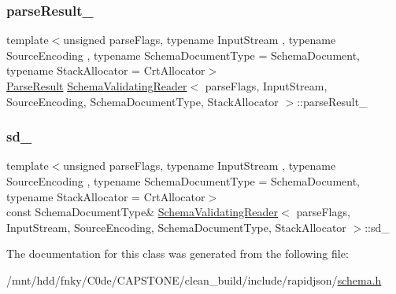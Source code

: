 \mbox{\label{classSchemaValidatingReader_a8d246c6285362e5a2eb578a6f7cebf25}} 
\subsubsection{\texorpdfstring{parse\+Result\+\_\+}{parseResult\_}}
{\footnotesize\ttfamily template$<$unsigned parse\+Flags, typename Input\+Stream , typename Source\+Encoding , typename Schema\+Document\+Type  = Schema\+Document, typename Stack\+Allocator  = Crt\+Allocator$>$ \\
\hyperlink{structParseResult}{Parse\+Result} \hyperlink{classSchemaValidatingReader}{Schema\+Validating\+Reader}$<$ parse\+Flags, Input\+Stream, Source\+Encoding, Schema\+Document\+Type, Stack\+Allocator $>$\+::parse\+Result\+\_\+\hspace{0.3cm}{\ttfamily [private]}}

\mbox{\label{classSchemaValidatingReader_a920ecfbd20bf519ef36af81239f97958}} 
\subsubsection{\texorpdfstring{sd\+\_\+}{sd\_}}
{\footnotesize\ttfamily template$<$unsigned parse\+Flags, typename Input\+Stream , typename Source\+Encoding , typename Schema\+Document\+Type  = Schema\+Document, typename Stack\+Allocator  = Crt\+Allocator$>$ \\
const Schema\+Document\+Type\& \hyperlink{classSchemaValidatingReader}{Schema\+Validating\+Reader}$<$ parse\+Flags, Input\+Stream, Source\+Encoding, Schema\+Document\+Type, Stack\+Allocator $>$\+::sd\+\_\+\hspace{0.3cm}{\ttfamily [private]}}



The documentation for this class was generated from the following file\+:\begin{DoxyCompactItemize}
\item 
/mnt/hdd/fnky/\+C0de/\+C\+A\+P\+S\+T\+O\+N\+E/clean\+\_\+build/include/rapidjson/\hyperlink{schema_8h}{schema.\+h}\end{DoxyCompactItemize}
